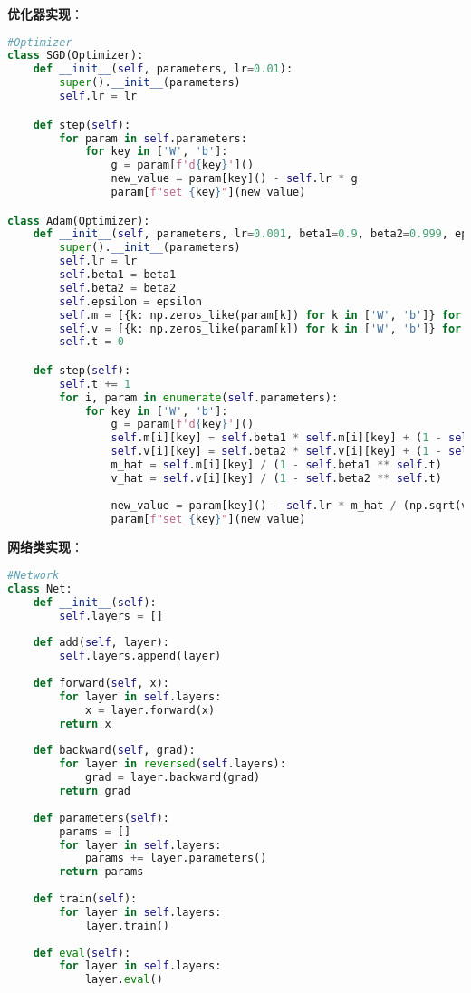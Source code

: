 \documentclass[a4paper, twocolumn]{article}
\begin{document}
\noindent \textbf{优化器实现}：
\begin{lstlisting}[language=Python]
#Optimizer
class SGD(Optimizer):
    def __init__(self, parameters, lr=0.01):
        super().__init__(parameters)
        self.lr = lr

    def step(self):
        for param in self.parameters:
            for key in ['W', 'b']:
                g = param[f'd{key}']()  
                new_value = param[key]() - self.lr * g 
                param[f"set_{key}"](new_value)  

class Adam(Optimizer):
    def __init__(self, parameters, lr=0.001, beta1=0.9, beta2=0.999, epsilon=1e-8):
        super().__init__(parameters)
        self.lr = lr
        self.beta1 = beta1
        self.beta2 = beta2
        self.epsilon = epsilon
        self.m = [{k: np.zeros_like(param[k]) for k in ['W', 'b']} for param in parameters]
        self.v = [{k: np.zeros_like(param[k]) for k in ['W', 'b']} for param in parameters]
        self.t = 0

    def step(self):
        self.t += 1
        for i, param in enumerate(self.parameters):
            for key in ['W', 'b']:
                g = param[f'd{key}']()  
                self.m[i][key] = self.beta1 * self.m[i][key] + (1 - self.beta1) * g
                self.v[i][key] = self.beta2 * self.v[i][key] + (1 - self.beta2) * (g ** 2)
                m_hat = self.m[i][key] / (1 - self.beta1 ** self.t)
                v_hat = self.v[i][key] / (1 - self.beta2 ** self.t)
    
                new_value = param[key]() - self.lr * m_hat / (np.sqrt(v_hat) + self.epsilon)  
                param[f"set_{key}"](new_value)  
\end{lstlisting}

\noindent \textbf{网络类实现}：
\begin{lstlisting}[language=Python]
#Network
class Net:
    def __init__(self):
        self.layers = []
    
    def add(self, layer):
        self.layers.append(layer)
        
    def forward(self, x):
        for layer in self.layers:
            x = layer.forward(x)
        return x
    
    def backward(self, grad):
        for layer in reversed(self.layers):
            grad = layer.backward(grad)
        return grad
    
    def parameters(self):
        params = []
        for layer in self.layers:
            params += layer.parameters()
        return params
    
    def train(self):
        for layer in self.layers:
            layer.train()
    
    def eval(self):
        for layer in self.layers:
            layer.eval()
\end{lstlisting}
\end{document}
